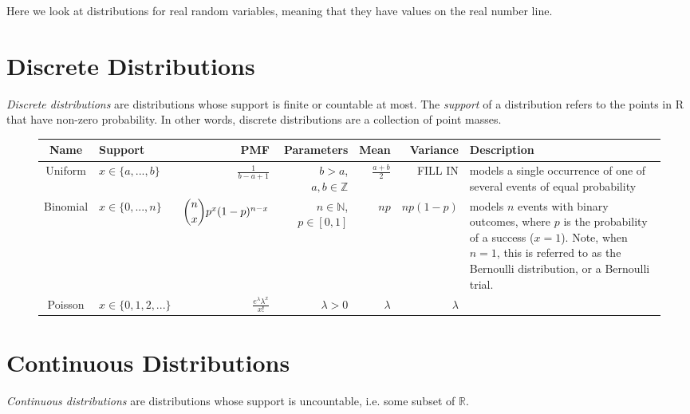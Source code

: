 \label{lab:distributions}

Here we look at distributions for real random variables, meaning that they have values on the real number line. 

\section*{Discrete Distributions}
\emph{Discrete distributions} are distributions whose support is finite or countable at most. 
The \emph{support} of a distribution refers to the points in R that have non-zero probability. 
In other words, discrete distributions are a collection of point masses. 

\begin{figure}[h]
\begin{center}
\begin{tabular}{|c|l|r|r|r|r|l|}
	\hline
Name & Support &  PMF & Parameters & Mean & Variance & Description\\
\hline
Uniform  & $x \in \{a,...,b\}$ &$\frac{1}{b-a+1}$ & $b>a$, $a,b \in \mathbb{Z}$ & $\frac{a+b}{2}$ & FILL IN & models a single occurrence of one of several events of equal probability \\
Binomial  & $x \in \{0,...,n\}$ &$\dbinom{n}{x}p^x(1-p)^{n-x}$ & $n \in \mathbb{N}$, $p \in [0,1]$ & $np$ & $np(1-p)$ & models $n$ events with binary outcomes, where $p$ is the probability of a success ($x=1$). Note, when $n=1$, this is referred to as the Bernoulli distribution, or a Bernoulli trial.\\
Poisson  & $x \in \{0,1,2,...\}$ & $\frac{e^\lambda \lambda^x}{x!}$ & $\lambda>0$ & $\lambda$ & $\lambda$ & \\
\hline
\end{tabular}
\end{center}
\end{figure}

\section*{Continuous Distributions}
\emph{Continuous distributions} are distributions whose support is uncountable, i.e. some subset of $\mathbb{R}$. 

